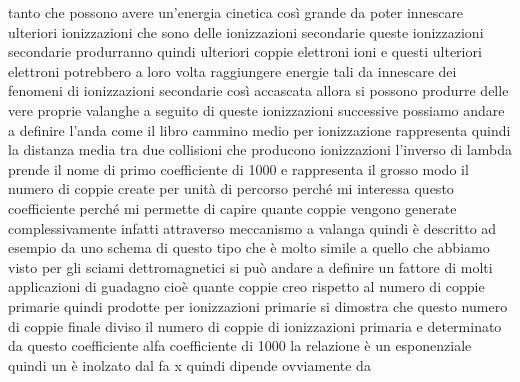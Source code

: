 tanto che possono avere un'energia cinetica così grande da poter innescare ulteriori ionizzazioni che sono delle ionizzazioni secondarie queste ionizzazioni secondarie produrranno quindi ulteriori coppie elettroni ioni e questi ulteriori elettroni potrebbero a loro volta raggiungere energie tali da innescare dei fenomeni di ionizzazioni secondarie così accascata allora si possono produrre delle vere proprie valanghe a seguito di queste ionizzazioni successive possiamo andare a definire l'anda come il libro cammino medio per ionizzazione rappresenta quindi la distanza media tra due collisioni che producono ionizzazioni l'inverso di lambda prende il nome di primo coefficiente di 1000 e rappresenta il grosso modo il numero di coppie create per unità di percorso perché mi interessa questo coefficiente perché mi permette di capire quante coppie vengono generate complessivamente infatti attraverso meccanismo a valanga quindi è descritto ad esempio da uno schema di questo tipo che è molto simile a quello che abbiamo visto per gli sciami dettromagnetici si può andare a definire un fattore di molti applicazioni di guadagno cioè quante coppie creo rispetto al numero di coppie primarie quindi prodotte per ionizzazioni primarie si dimostra che questo numero di coppie finale diviso il numero di coppie di ionizzazioni primaria e determinato da questo coefficiente alfa coefficiente di 1000 la relazione è un esponenziale quindi un è inolzato dal fa x quindi dipende ovviamente da 

